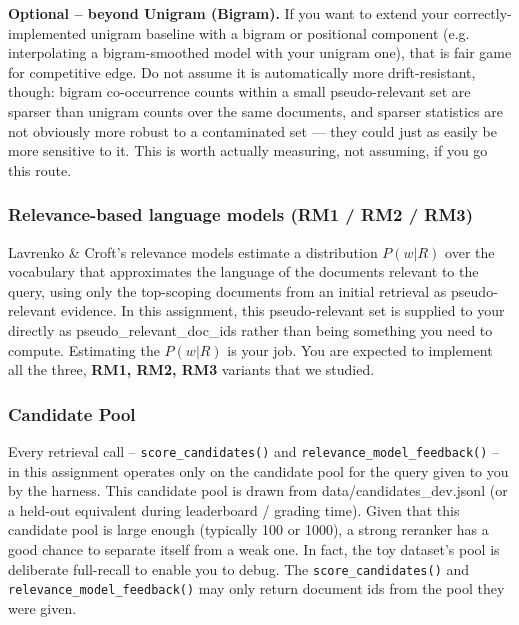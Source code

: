 \documentclass[10pt]{article}
\begin{document}
\textbf{Optional -- beyond Unigram (Bigram).} If you want to extend your correctly-implemented unigram baseline with a bigram or positional component (e.g. interpolating a bigram-smoothed model with your unigram one), that is fair game for competitive edge. Do not assume it is automatically more drift-resistant, though: bigram co-occurrence counts within a small pseudo-relevant set are sparser than unigram counts over the same documents, and sparser statistics are not obviously more robust to a contaminated set — they could just as easily be more sensitive to it. This is worth actually measuring, not assuming, if you go this route.


\subsubsection{Relevance-based language models (RM1 / RM2 / RM3)}
Lavrenko \& Croft's relevance models estimate a distribution $P(w | R)$ over the vocabulary that approximates the language of the documents relevant to the query, using only the top-scoping documents from an initial retrieval as pseudo-relevant evidence. In this assignment, this pseudo-relevant set is supplied to your directly as \textsf{pseudo\_relevant\_doc\_ids} rather than being something you need to compute. Estimating the $P(w | R)$ is your job. You are expected to implement all the three, \textbf{RM1, RM2, RM3} variants that we studied. 

\subsubsection{Candidate Pool}
Every retrieval call -- \texttt{score\_candidates()} and \texttt{relevance\_model\_feedback()} -- in this assignment operates only on the candidate pool for the query given to you by the harness. This candidate pool is drawn from \textsf{data/candidates\_dev.jsonl} (or a held-out equivalent during leaderboard / grading time). Given that this candidate pool is large enough (typically 100 or 1000), a strong reranker has a good chance to separate itself from a weak one. In fact, the toy dataset's pool is deliberate full-recall to enable you to debug. The \texttt{score\_candidates()} and \texttt{relevance\_model\_feedback()} may only return document ids from the pool they were given. 
\end{document}
